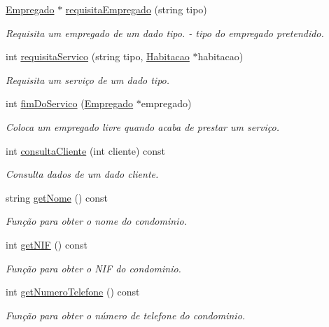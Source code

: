 \begin{DoxyCompactItemize}
\hyperlink{class_empregado}{Empregado} $\ast$ \hyperlink{class_condominio_a5eec0c5c3a1cb566332431939bcbcb56}{requisita\+Empregado} (string tipo)
\begin{DoxyCompactList}\small\item\em Requisita um empregado de um dado tipo.  -\/ tipo do empregado pretendido. \end{DoxyCompactList}\item 
int \hyperlink{class_condominio_adb5c91a9114dbc1c0f3c8c3e9f835152}{requisita\+Servico} (string tipo, \hyperlink{class_habitacao}{Habitacao} $\ast$habitacao)
\begin{DoxyCompactList}\small\item\em Requisita um serviço de um dado tipo. \end{DoxyCompactList}\item 
int \hyperlink{class_condominio_af2c2cdd83d43ea6641542efe01ff94b9}{fim\+Do\+Servico} (\hyperlink{class_empregado}{Empregado} $\ast$empregado)
\begin{DoxyCompactList}\small\item\em Coloca um empregado livre quando acaba de prestar um serviço. \end{DoxyCompactList}\item 
int \hyperlink{class_condominio_abfbd356bc26fde54dc40de2f9174f430}{consulta\+Cliente} (int cliente) const 
\begin{DoxyCompactList}\small\item\em Consulta dados de um dado cliente. \end{DoxyCompactList}\item 
string \hyperlink{class_condominio_a7e358e29fa8b970fe11c8208aaadab95}{get\+Nome} () const 
\begin{DoxyCompactList}\small\item\em Função para obter o nome do condominio. \end{DoxyCompactList}\item 
int \hyperlink{class_condominio_a131891ab8b9ca504227ec3f9edcbc326}{get\+N\+IF} () const 
\begin{DoxyCompactList}\small\item\em Função para obter o N\+IF do condominio. \end{DoxyCompactList}\item 
int \hyperlink{class_condominio_adc7a4de5ad8ace80c0290fff0619f22d}{get\+Numero\+Telefone} () const 
\begin{DoxyCompactList}\small\item\em Função para obter o número de telefone do condominio. \end{DoxyCompactList}\item 

\end{DoxyCompactItemize}
